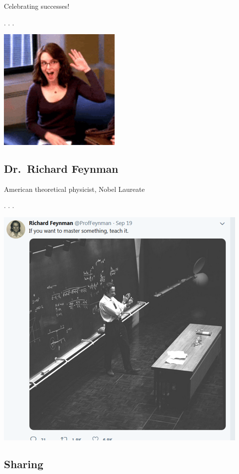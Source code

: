 \documentclass[
  letterpaper,
  DIV=11,
  numbers=noendperiod,
  oneside]{scrartcl}
\begin{document}
Celebrating successes!

. . .

\includegraphics[width=0.45\textwidth,height=\textheight]{w1_intro_files/mediabag/giphy.gif-cid=ecf05e1.gif}

\hypertarget{dr.-richard-feynman}{%
\subsection{Dr.~Richard Feynman}\label{dr.-richard-feynman}}

American theoretical physicist, Nobel Laureate

. . .

\includegraphics{./images/feynman_teach.png}

\hypertarget{sharing}{%
\subsection{Sharing}\label{sharing}}
\end{document}
